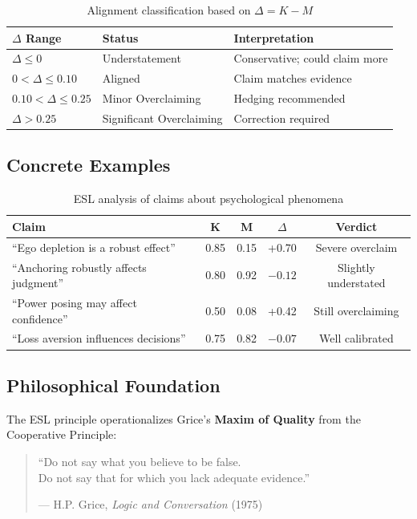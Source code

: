 \documentclass[11pt,a4paper]{article}
\begin{document}
\begin{table}[H]
\centering
\caption{Alignment classification based on $\Delta = K - M$}
\begin{tabular}{lll}
\toprule
\textbf{$\Delta$ Range} & \textbf{Status} & \textbf{Interpretation} \\
\midrule
$\Delta \leq 0$ & Understatement & Conservative; could claim more \\
$0 < \Delta \leq 0.10$ & Aligned & Claim matches evidence \\
$0.10 < \Delta \leq 0.25$ & Minor Overclaiming & Hedging recommended \\
$\Delta > 0.25$ & Significant Overclaiming & Correction required \\
\bottomrule
\end{tabular}
\end{table}


\subsection{Concrete Examples}

\begin{table}[H]
\centering
\caption{ESL analysis of claims about psychological phenomena}
\begin{tabular}{lcccc}
\toprule
\textbf{Claim} & \textbf{K} & \textbf{M} & \textbf{$\Delta$} & \textbf{Verdict} \\
\midrule
``Ego depletion is a robust effect'' & 0.85 & 0.15 & +0.70 & Severe overclaim \\
``Anchoring robustly affects judgment'' & 0.80 & 0.92 & $-0.12$ & Slightly understated \\
``Power posing may affect confidence'' & 0.50 & 0.08 & +0.42 & Still overclaiming \\
``Loss aversion influences decisions'' & 0.75 & 0.82 & $-0.07$ & Well calibrated \\
\bottomrule
\end{tabular}
\end{table}


\subsection{Philosophical Foundation}

The ESL principle operationalizes Grice's \textbf{Maxim of Quality} from the Cooperative Principle:
\begin{quote}
``Do not say what you believe to be false.\\
Do not say that for which you lack adequate evidence.''

--- H.P. Grice, \emph{Logic and Conversation} (1975)
\end{quote}
\end{document}
